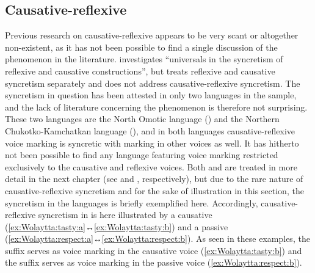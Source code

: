 \subsection{Causative-reflexive} \label{sec:simple-syncretism:caus-refl}
Previous research on causative-reflexive appears to be very scant or altogether non-existent, as it has not been possible to find a single discussion of the phenomenon in the literature. \cite{pederson:1991} investigates “universals in the syncretism of reflexive and causative constructions”, but treats reflexive and causative syncretism separately and does not address causative-reflexive syncretism. The syncretism in question has been attested in only two languages in the sample, and the lack of literature concerning the phenomenon is therefore not surprising. These two languages are the North Omotic language  () and the Northern Chukotko-Kamchatkan language  (), and in both languages causative-reflexive voice marking is syncretic with marking in other voices as well. It has hitherto not been possible to find any language featuring voice marking restricted exclusively to the causative and reflexive voices. Both  and  are treated in more detail in the next chapter (see  and , respectively), but due to the rare nature of causative-reflexive syncretism and for the sake of illustration in this section, the syncretism in the languages is briefly exemplified here. Accordingly, causative-reflexive syncretism in  is here illustrated by a causative  (\ref{ex:Wolaytta:tasty:a}↔\ref{ex:Wolaytta:tasty:b}) and a passive  (\ref{ex:Wolaytta:respect:a}↔\ref{ex:Wolaytta:respect:b}). As seen in these examples, the suffix  serves as voice marking in the causative voice (\ref{ex:Wolaytta:tasty:b}) and the suffix  serves as voice marking in the passive voice (\ref{ex:Wolaytta:respect:b}).

